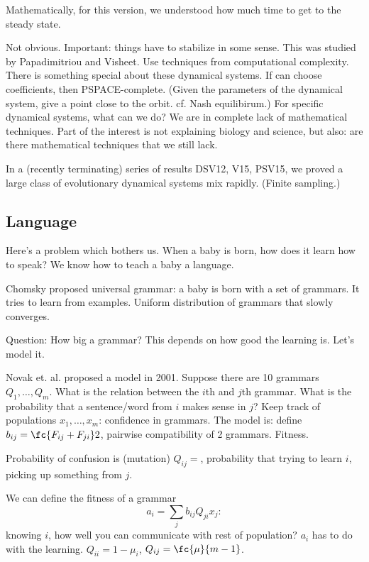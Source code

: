 Mathematically, for this version, we understood how much time to get to the steady state.

Not obvious. Important: things have to stabilize in some sense. This was studied by Papadimitriou and Visheet. Use techniques from computational complexity. There is something special about these dynamical systems. If can choose coefficients, then PSPACE-complete. (Given the parameters of the dynamical system, give a point close to the orbit. cf. Nash equilibirum.) For specific dynamical systems, what can we do? We are in complete lack of mathematical techniques. Part of the interest is not explaining biology and science, but also: are there mathematical techniques that we still lack. %

In a (recently terminating) series of results DSV12, V15, PSV15, we proved a large class of evolutionary dynamical systems mix rapidly. (Finite sampling.)


\subsection{Language}

Here's a problem which bothers us. When a baby is born, how does it learn how to speak? We know how to teach a baby a language.

Chomsky proposed universal grammar: a baby is born with a set of grammars. It tries to learn from examples.  
Uniform distribution of grammars that slowly converges.

Question: How big a grammar? This depends on how good the learning is. Let's model it.

Novak et. al. proposed a model in 2001. Suppose there are 10 grammars $Q_1,\ldots, Q_m$. What is the relation between the $i$th and $j$th grammar. What is the probability that a sentence/word from $i$ makes sense in $j$? Keep track of populations $x_1,\ldots, x_m$: confidence in grammars. 
The model is: define $b_{ij}=\fc{F_{ij}+F_{ji}}2$, pairwise compatibility of 2 grammars. Fitness.

Probability of confusion is (mutation)
$Q_{ij}=$,
probability that trying to learn $i$, picking up something from $j$.

We can define the fitness of a grammar 
\[
a_i = \sum_j b_{ij} Q_{ji}x_j:
\]
knowing $i$, how well you can communicate with rest of population?
$a_i$ has to do with the learning. $Q_{ii}=1-\mu_i$, $Q_{ij}=\fc{\mu}{m-1}$.

